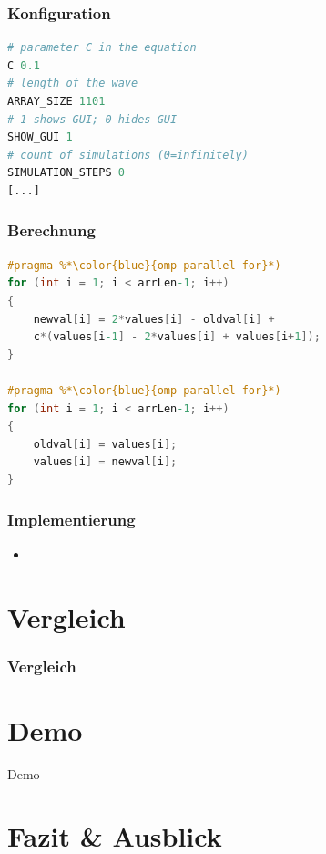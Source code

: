 \documentclass[xcolor=dvipsnames]{beamer}
\begin{document}
\begin{frame}[fragile]\frametitle{Konfiguration}
\begin{lstlisting}[language=Python]
# parameter C in the equation
C 0.1
# length of the wave
ARRAY_SIZE 1101
# 1 shows GUI; 0 hides GUI
SHOW_GUI 1
# count of simulations (0=infinitely)
SIMULATION_STEPS 0
[...]
\end{lstlisting}
\end{frame}

\begin{frame}[fragile]\frametitle{Berechnung}
\begin{lstlisting}[language=C]
#pragma %*\color{blue}{omp parallel for}*)
for (int i = 1; i < arrLen-1; i++)
{ 
    newval[i] = 2*values[i] - oldval[i] + 
    c*(values[i-1] - 2*values[i] + values[i+1]);
}

#pragma %*\color{blue}{omp parallel for}*)
for (int i = 1; i < arrLen-1; i++)
{ 
    oldval[i] = values[i];
    values[i] = newval[i];
}
\end{lstlisting}
\end{frame}

\begin{frame}\frametitle{Implementierung}
	\begin{itemize}
		\item %
	\end{itemize}
\end{frame}

\section{Vergleich}
\frame{\tableofcontents[current]}
\begin{frame}\frametitle{Vergleich}
\end{frame}

\section{Demo}
\begin{frame}
	\centering
	\textcolor{htwgreen}{{\LARGE Demo}}
\end{frame}

\section{Fazit \& Ausblick}
\frame{\tableofcontents[current]}
\end{document}

